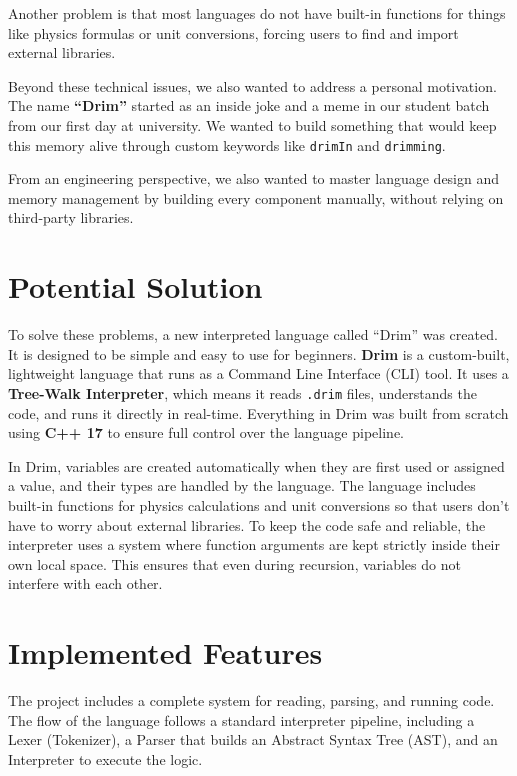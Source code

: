 \documentclass[12pt, a4paper]{article}
\begin{document}
\vspace{0.8cm}

Another problem is that most languages do not have built-in functions for things like physics formulas or unit conversions, forcing users to find and import external libraries. 

\vspace{0.8cm}

Beyond these technical issues, we also wanted to address a personal motivation. The name \textbf{“Drim”} started as an inside joke and a meme in our student batch from our first day at university. We wanted to build something that would keep this memory alive through custom keywords like \texttt{drimIn} and \texttt{drimming}. 

\vspace{0.8cm}

From an engineering perspective, we also wanted to master language design and memory management by building every component manually, without relying on third-party libraries.

\newpage

\section{Potential Solution}
To solve these problems, a new interpreted language called ``Drim'' was created. It is designed to be simple and easy to use for beginners. \textbf{Drim} is a custom-built, lightweight language that runs as a Command Line Interface (CLI) tool. It uses a \textbf{Tree-Walk Interpreter}, which means it reads \texttt{.drim} files, understands the code, and runs it directly in real-time. Everything in Drim was built from scratch using \textbf{C++ 17} to ensure full control over the language pipeline.

\vspace{0.4cm}

In Drim, variables are created automatically when they are first used or assigned a value, and their types are handled by the language. The language includes built-in functions for physics calculations and unit conversions so that users don't have to worry about external libraries. To keep the code safe and reliable, the interpreter uses a system where function arguments are kept strictly inside their own local space. This ensures that even during recursion, variables do not interfere with each other.

\newpage

\section{Implemented Features}
The project includes a complete system for reading, parsing, and running code. The flow of the language follows a standard interpreter pipeline, including a Lexer (Tokenizer), a Parser that builds an Abstract Syntax Tree (AST), and an Interpreter to execute the logic.
\end{document}
